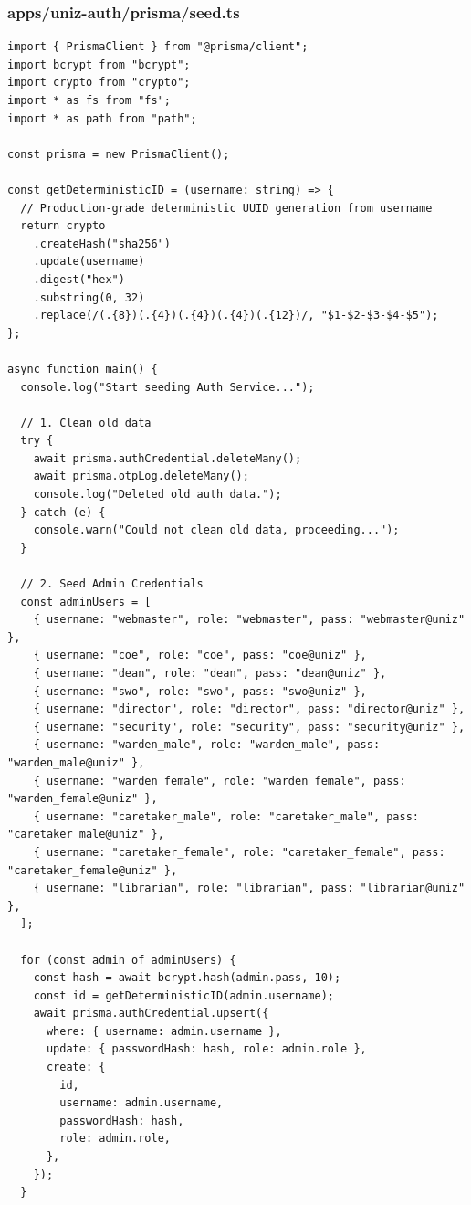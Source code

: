 \documentclass[11pt,a4paper,oneside]{article}
\begin{document}
\subsubsection*{apps/uniz-auth/prisma/seed.ts}
\begin{lstlisting}
import { PrismaClient } from "@prisma/client";
import bcrypt from "bcrypt";
import crypto from "crypto";
import * as fs from "fs";
import * as path from "path";

const prisma = new PrismaClient();

const getDeterministicID = (username: string) => {
  // Production-grade deterministic UUID generation from username
  return crypto
    .createHash("sha256")
    .update(username)
    .digest("hex")
    .substring(0, 32)
    .replace(/(.{8})(.{4})(.{4})(.{4})(.{12})/, "$1-$2-$3-$4-$5");
};

async function main() {
  console.log("Start seeding Auth Service...");

  // 1. Clean old data
  try {
    await prisma.authCredential.deleteMany();
    await prisma.otpLog.deleteMany();
    console.log("Deleted old auth data.");
  } catch (e) {
    console.warn("Could not clean old data, proceeding...");
  }

  // 2. Seed Admin Credentials
  const adminUsers = [
    { username: "webmaster", role: "webmaster", pass: "webmaster@uniz" },
    { username: "coe", role: "coe", pass: "coe@uniz" },
    { username: "dean", role: "dean", pass: "dean@uniz" },
    { username: "swo", role: "swo", pass: "swo@uniz" },
    { username: "director", role: "director", pass: "director@uniz" },
    { username: "security", role: "security", pass: "security@uniz" },
    { username: "warden_male", role: "warden_male", pass: "warden_male@uniz" },
    { username: "warden_female", role: "warden_female", pass: "warden_female@uniz" },
    { username: "caretaker_male", role: "caretaker_male", pass: "caretaker_male@uniz" },
    { username: "caretaker_female", role: "caretaker_female", pass: "caretaker_female@uniz" },
    { username: "librarian", role: "librarian", pass: "librarian@uniz" },
  ];

  for (const admin of adminUsers) {
    const hash = await bcrypt.hash(admin.pass, 10);
    const id = getDeterministicID(admin.username);
    await prisma.authCredential.upsert({
      where: { username: admin.username },
      update: { passwordHash: hash, role: admin.role },
      create: {
        id,
        username: admin.username,
        passwordHash: hash,
        role: admin.role,
      },
    });
  }


\end{lstlisting}
\end{document}
